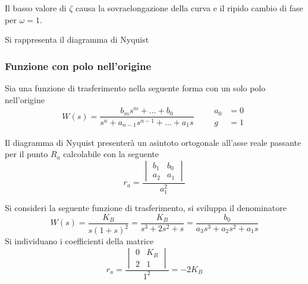 Il basso valore di $\zeta$ causa la sovraelongazione della curva e il ripido
cambio di fase per $\omega=1$.

\newpage
Si rappresenta il diagramma di Nyquist
\begin{figure}[h]
\centering
{}
\end{figure}

\subsubsection{Funzione con polo nell'origine}
Sia una funzione di trasferimento nella seguente forma con un solo polo
nell'origine
$$
W(s) = \frac{b_ms^m + \ldots + b_0}{s^n+a_{n-1}s^{n-1} + \ldots + a_1s}\qquad
\begin{aligned}
a_0 &= 0\\
g &= 1
\end{aligned}
$$

Il diagramma di Nyquist presenterà un asintoto
ortogonale all'asse reale passante per il punto $R_a$ calcolabile con la
seguente
$$
r_a = \frac{
\begin{vmatrix}
b_1 & b_0 \\
a_2 & a_1
\end{vmatrix}
}
{a_1^2}
$$

Si consideri la seguente funzione di trasferimento, si sviluppa il denominatore
$$
W(s) = \frac{K_B}{s(1+s)^2} = \frac{K_B}{s^3+2s^2 + s} =
\frac{b_0}{a_3s^3+a_2s^2 + a_1s}
$$
Si individuano i coefficienti della matrice
$$
r_a = \frac{
\begin{vmatrix}
0 & K_B\\
2 & 1
\end{vmatrix}
}
{1^2} = -2K_B
$$

